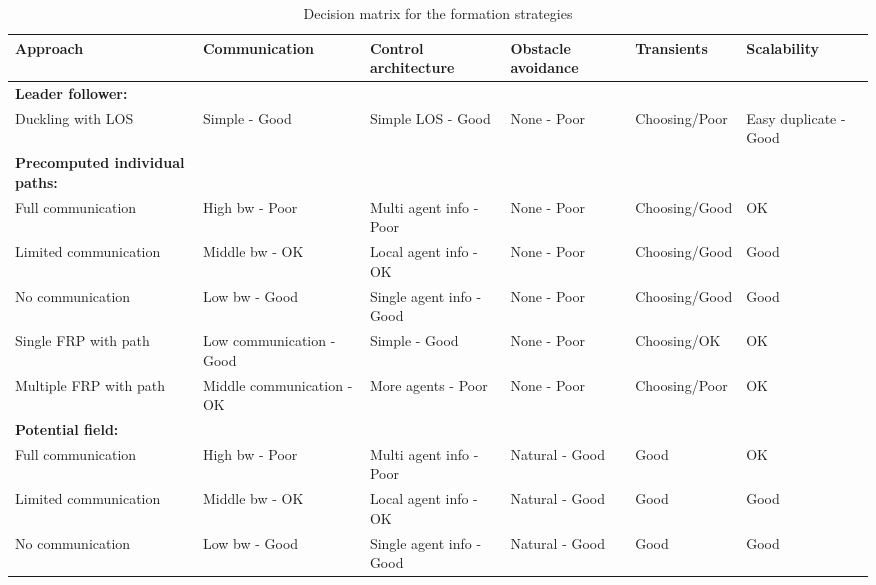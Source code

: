 \begin{sidewaystable}
\begin{tabular}{l|lllll}
\toprule
\textbf{Approach} & \textbf{Communication} & \textbf{Control architecture} & \textbf{Obstacle avoidance} & \textbf{Transients} & \textbf{Scalability}\\
\hline
\textbf{Leader follower:}&&&&&\\
Duckling with LOS& Simple - Good & Simple LOS - Good & None - Poor & Choosing/Poor & Easy duplicate - Good\\
\textbf{Precomputed individual paths:}&&&&&\\
Full communication& High bw - Poor & Multi agent info - Poor & None - Poor & Choosing/Good & OK\\
Limited communication& Middle bw - OK & Local agent info - OK & None - Poor & Choosing/Good & Good\\
No communication& Low bw - Good & Single agent info - Good & None - Poor & Choosing/Good & Good\\
Single \ac{FRP} with path& Low communication - Good & Simple - Good & None - Poor & Choosing/OK & OK\\
Multiple \ac{FRP} with path& Middle communication - OK & More agents - Poor & None - Poor & Choosing/Poor & OK\\
\textbf{Potential field:}&&&&&\\
Full communication& High bw - Poor & Multi agent info - Poor & Natural - Good & Good & OK\\
Limited communication& Middle bw - OK & Local agent info - OK & Natural - Good & Good & Good\\
No communication& Low bw - Good & Single agent info - Good & Natural - Good & Good & Good\\
\bottomrule
\end{tabular}
\caption{Decision matrix for the formation strategies}
\label{tab:decision-matrix}
\end{sidewaystable}

